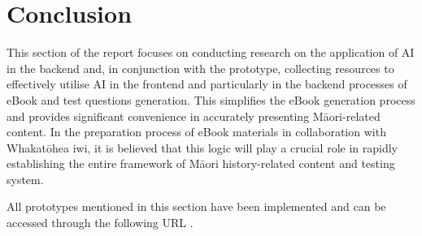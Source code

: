 \section{Conclusion}
This section of the report focuses on conducting research on the application of AI in the backend and, in conjunction with the prototype, collecting resources to effectively utilise AI in the frontend and particularly in the backend processes of eBook and test questions generation. 
This simplifies the eBook generation process and provides significant convenience in accurately presenting Māori-related content. 
In the preparation process of eBook materials in collaboration with Whakatōhea iwi, it is believed that this logic will play a crucial role in rapidly establishing the entire framework of Māori history-related content and testing system.

All prototypes mentioned in this section have been implemented and can be accessed through the following URL \autocite{Page1wh37:online}.
